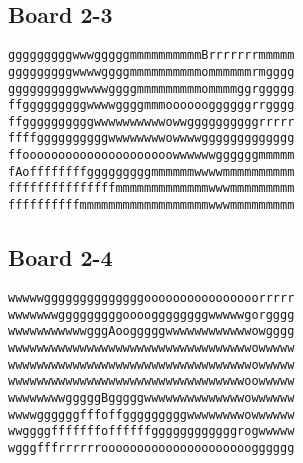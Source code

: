 \documentclass[11pt,a4paper]{article}
\begin{document}
\subsection*{Board 2-3}
\begin{lstlisting}
gggggggggwwwgggggmmmmmmmmmmBrrrrrrrmmmmm
gggggggggwwwwggggmmmmmmmmmmommmmmmrmgggg
ggggggggggwwwwggggmmmmmmmmmommmmggrggggg
ffgggggggggwwwwggggmmmooooooggggggrrgggg
ffggggggggggwwwwwwwwwwowwggggggggggrrrrr
ffffggggggggggwwwwwwwwowwwwggggggggggggg
ffooooooooooooooooooooowwwwwwggggggmmmmm
fAoffffffffgggggggggmmmmmmwwwwmmmmmmmmmm
fffffffffffffffmmmmmmmmmmmmmwwwmmmmmmmmm
ffffffffffmmmmmmmmmmmmmmmmmmwwwmmmmmmmmm
\end{lstlisting}

\subsection*{Board 2-4}
\begin{lstlisting}
wwwwwggggggggggggggoooooooooooooooorrrrr
wwwwwwwgggggggggooooggggggggwwwwwgorgggg
wwwwwwwwwwwgggAoogggggwwwwwwwwwwwwowgggg
wwwwwwwwwwwwwwwwwwwwwwwwwwwwwwwwwwowwwww
wwwwwwwwwwwwwwwwwwwwwwwwwwwwwwwwwwowwwww
wwwwwwwwwwwwwwwwwwwwwwwwwwwwwwwwwoowwwww
wwwwwwwwgggggBgggggwwwwwwwwwwwwwwowwwwww
wwwwggggggfffoffgggggggggwwwwwwwwowwwwww
wwggggfffffffoffffffggggggggggggrogwwwww
wgggfffrrrrrrooooooooooooooooooooogggggg
\end{lstlisting}
\end{document}
